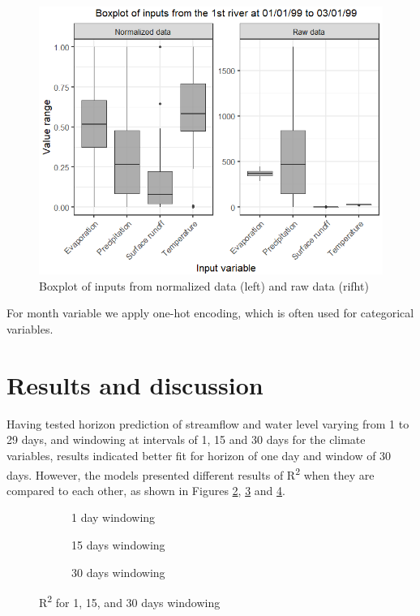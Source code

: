\documentclass[12pt]{article}
\begin{document}
\begin{figure}[htbp]
  \centering
  \includegraphics[width=0.8\linewidth, trim=0cm 0 0 .7cm,clip=true]{Figures/Normalização.png}
  \caption{Boxplot of inputs from normalized data (left) and raw data (rifht)}
  \label{fig:Normalized}
\end{figure}

For month variable we apply one-hot encoding, which is often used for categorical variables.

\section{Results and discussion}

Having tested horizon prediction of streamflow and water level varying from 1 to 29 days, and windowing at intervals of 1, 15 and 30 days for the climate variables, results indicated better fit for horizon of one day and window of 30 days. However, the models presented different results of R\textsuperscript{2} when they are compared to each other, as shown in Figures \ref{fig:r2_1}, \ref{fig:r2_15} and \ref{fig:r2_30}.

\begin{figure}[htbp]
    \centering
    \begin{subfigure}[b]{.49\textwidth}
        \centering
        
        \caption{1 day windowing}
        \label{fig:r2_1}
    \end{subfigure}
    \begin{subfigure}[b]{.49\textwidth}
        \centering
        
        \caption{15 days windowing}
        \label{fig:r2_15}
    \end{subfigure}
    \begin{subfigure}[b]{\textwidth}
        \centering
        
        \captionsetup{justification=justified,singlelinecheck=false}
        \caption{30 days windowing}
        \label{fig:r2_30}
    \end{subfigure}
    \caption{R\textsuperscript{2} for  1,  15, and  30 days windowing}
    \label{fig:r2}
\end{figure}
\end{document}
